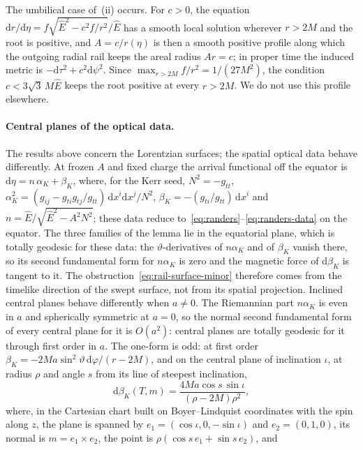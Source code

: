 \documentclass[12pt]{iopart}
\theoremstyle{plain}
\theoremstyle{definition}
\theoremstyle{remark}
\newcommand{\Ehat}{\hat E}
\newcommand{\dd}{\mathrm{d}}
\begin{document}
The umbilical case of~(ii) occurs. For $c>0$, the equation
$\dd r/\dd\eta=f\sqrt{\Ehat^2-c^2f/r^2}/\Ehat$ has a smooth local solution wherever
$r>2M$ and the root is positive, and $A=c/r(\eta)$ is then a smooth positive profile
along which the outgoing radial rail keeps the areal radius $Ar=c$; in proper time the
induced metric is $-\dd\tau^2+c^2\dd\psi^2$. Since $\max_{r>2M}f/r^2=1/(27M^2)$, the
condition $c<3\sqrt3\,M\Ehat$ keeps the root positive at every $r>2M$. We do not use this
profile elsewhere.

\paragraph{Central planes of the optical data.}
The results above concern the Lorentzian surfaces; the spatial optical data behave
differently. At frozen $A$ and fixed charge the arrival functional off the equator is
$\dd\eta=n\,\alpha_K+\beta_K$, where, for the Kerr seed, $N^2=-g_{tt}$,
$\alpha_K^2=(g_{ij}-g_{ti}g_{tj}/g_{tt})\,\dd x^i\dd x^j/N^2$,
$\beta_K=-(g_{ti}/g_{tt})\,\dd x^i$ and $n=\Ehat/\sqrt{\Ehat^2-A^2N^2}$; these data reduce
to~\eqref{eq:randers}--\eqref{eq:randers-data} on the equator. The three families of the
lemma lie in the equatorial plane, which is totally geodesic for these data: the
$\vartheta$-derivatives of $n\alpha_K$ and of $\beta_K$ vanish there, so its second
fundamental form for $n\alpha_K$ is zero and the magnetic force of $\dd\beta_K$ is tangent
to it. The obstruction~\eqref{eq:rail-surface-minor} therefore comes from the timelike
direction of the swept surface, not from its spatial projection. Inclined central planes
behave differently when $a\neq0$. The Riemannian part $n\alpha_K$ is even in $a$ and
spherically symmetric at $a=0$, so the normal second fundamental form of every central plane
for it is $O(a^2)$: central planes are totally geodesic for it through first order in $a$. The one-form is odd: at first order
$\beta_K=-2Ma\sin^2\vartheta\,\dd\varphi/(r-2M)$, and on the central plane of inclination
$\iota$, at radius $\rho$ and angle $s$ from its line of steepest inclination,
\begin{equation}
    \dd\beta_K(T,m)=\frac{4Ma\cos s\,\sin\iota}{(\rho-2M)\rho^2},
    \label{eq:inclined-plane-force}
\end{equation}
where, in the Cartesian chart built on Boyer--Lindquist coordinates with the spin along
$z$, the plane is spanned by $e_1=(\cos\iota,0,-\sin\iota)$ and $e_2=(0,1,0)$, its normal is
$m=e_1\times e_2$, the point is $\rho(\cos s\,e_1+\sin s\,e_2)$, and
\end{document}
